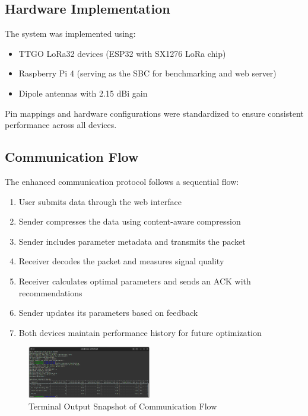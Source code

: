 \documentclass[conference]{IEEEtran}
\begin{document}
\subsection{Hardware Implementation}
The system was implemented using:
\begin{itemize}
    \item TTGO LoRa32 devices (ESP32 with SX1276 LoRa chip)
    \item Raspberry Pi 4 (serving as the SBC for benchmarking and web server)
    \item Dipole antennas with 2.15 dBi gain
\end{itemize}

Pin mappings and hardware configurations were standardized to ensure consistent performance across all devices.

\subsection{Communication Flow}
The enhanced communication protocol follows a sequential flow:

\begin{enumerate}
    \item User submits data through the web interface
    \item Sender compresses the data using content-aware compression
    \item Sender includes parameter metadata and transmits the packet
    \item Receiver decodes the packet and measures signal quality
    \item Receiver calculates optimal parameters and sends an ACK with recommendations
    \item Sender updates its parameters based on feedback
    \item Both devices maintain performance history for future optimization
\end{enumerate}

\begin{figure}[htbp]
\centering
\includegraphics[width=0.48\textwidth]{images/terminal-output-snapshot.png}
\caption{Terminal Output Snapshot of Communication Flow}
\label{fig:terminal_output}
\end{figure}
\end{document}
